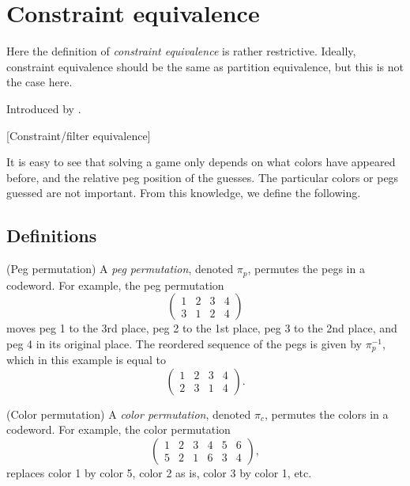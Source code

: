\section{Constraint equivalence}

Here the definition of \emph{constraint equivalence} is rather restrictive. Ideally, constraint equivalence should be the same as partition equivalence, but this is not the case here.

Introduced by \cite{neuwirth81,koyama93}. 

[Constraint/filter equivalence]

It is easy to see that solving a game only depends on what colors have appeared before, and the relative peg position of the guesses. The particular colors or pegs guessed are not important. From this knowledge, we define the following.

\subsection{Definitions}

\begin{definition}
(Peg permutation) A \emph{peg permutation}, denoted $\pi_p$, permutes the pegs in a codeword. For example, the peg permutation
\[
\begin{pmatrix}
1 & 2 & 3 & 4 \\
3 & 1 & 2 & 4
\end{pmatrix} 
\]
moves peg 1 to the 3rd place, peg 2 to the 1st place, peg 3 to the 2nd place, and peg 4 in its original place. The reordered sequence of the pegs is given by $\pi_p^{-1}$, which in this example is equal to
\[
\begin{pmatrix}
1 & 2 & 3 & 4 \\
2 & 3 & 1 & 4
\end{pmatrix} .
\]
\end{definition}

\begin{definition}
(Color permutation) A \emph{color permutation}, denoted $\pi_c$, permutes the colors in a codeword. For example, the color permutation
\[
\begin{pmatrix}
1 & 2 & 3 & 4 & 5 & 6 \\
5 & 2 & 1 & 6 & 3 & 4
\end{pmatrix} ,
\]
replaces color 1 by color 5, color 2 as is, color 3 by color 1, etc.
\end{definition}

